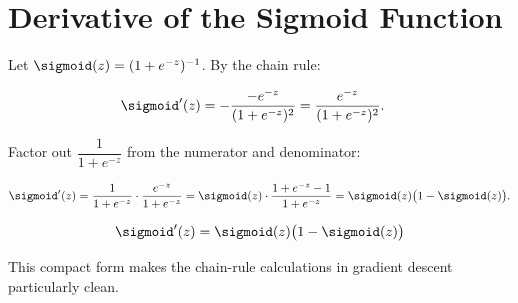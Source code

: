 \documentclass[12pt, a4paper]{article}
\begin{document}
\appendix
\section{Derivative of the Sigmoid Function}
\label{app:sigmoid-deriv}

Let $\sigmoid(z) = (1 + e^{-z})^{-1}$.  By the chain rule:

\begin{align*}
  \sigmoid'(z)
   & = -\frac{-e^{-z}}{(1+e^{-z})^2}
  = \frac{e^{-z}}{(1+e^{-z})^2}.
\end{align*}

Factor out $\dfrac{1}{1+e^{-z}}$ from the numerator and denominator:

\[
  \sigmoid'(z)
  = \frac{1}{1+e^{-z}} \cdot \frac{e^{-z}}{1+e^{-z}}
  = \sigmoid(z) \cdot \frac{1+e^{-z}-1}{1+e^{-z}}
  = \sigmoid(z)\bigl(1 - \sigmoid(z)\bigr).
\]

\begin{resultbox}
  \[
    \sigmoid'(z) = \sigmoid(z)\bigl(1 - \sigmoid(z)\bigr)
  \]
\end{resultbox}

This compact form makes the chain-rule calculations in gradient descent
particularly clean.
\end{document}
